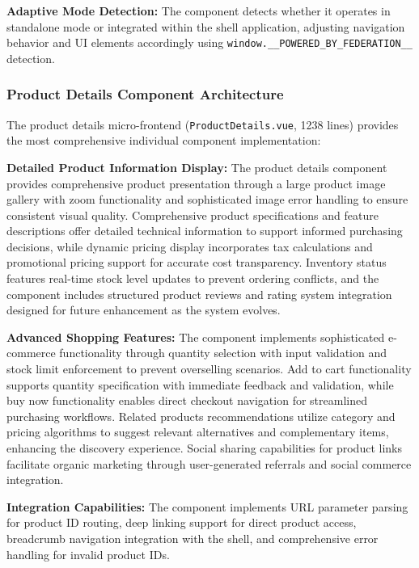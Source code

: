 \documentclass[12pt,a4paper]{report}
\begin{document}
\textbf{Adaptive Mode Detection:} The component detects whether it operates in standalone mode or integrated within the shell application, adjusting navigation behavior and UI elements accordingly using \texttt{window.\_\_POWERED\_BY\_FEDERATION\_\_} detection.

\subsubsection{Product Details Component Architecture}

The product details micro-frontend (\texttt{ProductDetails.vue}, 1238 lines) provides the most comprehensive individual component implementation:

\textbf{Detailed Product Information Display:} The product details component provides comprehensive product presentation through a large product image gallery with zoom functionality and sophisticated image error handling to ensure consistent visual quality. Comprehensive product specifications and feature descriptions offer detailed technical information to support informed purchasing decisions, while dynamic pricing display incorporates tax calculations and promotional pricing support for accurate cost transparency. Inventory status features real-time stock level updates to prevent ordering conflicts, and the component includes structured product reviews and rating system integration designed for future enhancement as the system evolves.

\textbf{Advanced Shopping Features:} The component implements sophisticated e-commerce functionality through quantity selection with input validation and stock limit enforcement to prevent overselling scenarios. Add to cart functionality supports quantity specification with immediate feedback and validation, while buy now functionality enables direct checkout navigation for streamlined purchasing workflows. Related products recommendations utilize category and pricing algorithms to suggest relevant alternatives and complementary items, enhancing the discovery experience. Social sharing capabilities for product links facilitate organic marketing through user-generated referrals and social commerce integration.

\textbf{Integration Capabilities:} The component implements URL parameter parsing for product ID routing, deep linking support for direct product access, breadcrumb navigation integration with the shell, and comprehensive error handling for invalid product IDs.
\end{document}
